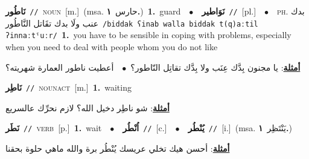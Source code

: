 \documentclass[10pt,a4paper,twoside]{article} %
\begin{document}
\begin{multicols}{2}
{\setlength\topsep{0pt}\textbf{\foreignlanguage{arabic}{نَاطُور}}\ {\color{gray}\texttt{//}\color{black}}\ \textsc{noun}\ [m.]\ \color{gray}(msa. \foreignlanguage{arabic}{حارس}~\foreignlanguage{arabic}{\textbf{١.}})\color{black}\ \textbf{1.}~guard\ \ $\bullet$\ \ \setlength\topsep{0pt}\textbf{\foreignlanguage{arabic}{نَوَاطير}}\ {\color{gray}\texttt{//}\color{black}}\ [pl.]\ \ $\bullet$\ \ \textsc{ph.} \color{gray} \foreignlanguage{arabic}{بدك عنب ولَا بدك تقَاتل النَّاطُور}\color{black}\ {\color{gray}\texttt{/{\sffamily biddak ʕinab walla biddak t(q)aːtil ʔinnaːtˤuːr}/}\color{black}}\ \textbf{1.}~you have to be sensible in coping with problems, especially when you need to deal with people whom you do not like\  \begin{flushright}\color{gray}\foreignlanguage{arabic}{\textbf{\underline{\foreignlanguage{arabic}{أمثلة}}}: يا مجنون بِدَّك عِنَب ولا بِدَّك تقاتِل النّاطور؟\ $\bullet$\ \  أعطيت ناطور العمارة شهريته؟}\end{flushright}\color{black}} \vspace{2mm}

{\setlength\topsep{0pt}\textbf{\foreignlanguage{arabic}{نَاطِر}}\ {\color{gray}\texttt{//}\color{black}}\ \textsc{noun\textunderscore act}\ [m.]\ \textbf{1.}~waiting\  \begin{flushright}\color{gray}\foreignlanguage{arabic}{\textbf{\underline{\foreignlanguage{arabic}{أمثلة}}}: شو ناطِر دخيل الله؟ لازم نحرِّك عالسريع}\end{flushright}\color{black}} \vspace{2mm}

{\setlength\topsep{0pt}\textbf{\foreignlanguage{arabic}{نَطَر}}\ {\color{gray}\texttt{//}\color{black}}\ \textsc{verb}\ [p.]\ \textbf{1.}~wait\ \ $\bullet$\ \ \setlength\topsep{0pt}\textbf{\foreignlanguage{arabic}{اُنْطُر}}\ {\color{gray}\texttt{//}\color{black}}\ [c.]\ \ $\bullet$\ \ \setlength\topsep{0pt}\textbf{\foreignlanguage{arabic}{يُنْطُر}}\ {\color{gray}\texttt{//}\color{black}}\ [i.]\ \color{gray}(msa. \foreignlanguage{arabic}{يَنْتَظِر}~\foreignlanguage{arabic}{\textbf{١.}})\color{black}\  \begin{flushright}\color{gray}\foreignlanguage{arabic}{\textbf{\underline{\foreignlanguage{arabic}{أمثلة}}}: أحسن هيك تخلي عريسك يُنْطُر برة والله ماهي حلوة بحقنا}\end{flushright}\color{black}} \vspace{2mm}


\end{multicols}
\end{document}
